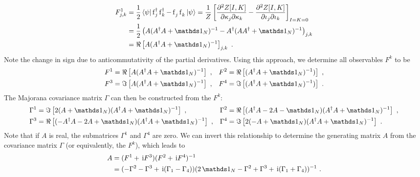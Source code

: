 \documentclass[letter]{article}
\begin{document}
\begin{align}
F^1_{j,k} &= \frac{1}{2}\sandwich{\psi}{\fd_j \fd_k - \fe_j \fe_k}{\psi} = \frac{1}{Z} \left[  \frac{\partial^2 Z[I,K]}{\partial\kappa_j\partial\kappa_k} - \frac{\partial^2 Z[I,K]}{\partial\iota_j\partial\iota_k} \right]_{I=K=0} \nonumber\\
&= \frac{1}{2}\left( A (A^\dagger A + \id_N)^{-1} - A^\dagger (A A^\dagger + \id_N)^{-1}\right)_{j,k} \nonumber\\
&= \Re\left[ A (A^\dagger A + \id_N)^{-1} \right]_{j,k} \ .
\end{align}
Note the change in sign due to anticommutativity of the partial derivatives.
Using this approach, we determine all observables $F^k$ to be 
\begin{equation}
\begin{aligned}
F^1 &= \Re\left[ A (A^\dagger A + \id_N)^{-1} \right] \ , &
F^2 &= \Re\left[(A^\dagger A + \id_N)^{-1}) \right] \ , \\
F^3 &= \Im\left[ A (A^\dagger A + \id_N)^{-1} \right] \ , &
F^4 &= \Im\left[(A^\dagger A + \id_N)^{-1}) \right] \ .
\end{aligned}
\end{equation}
The Majorana covariance matrix $\Gamma$ can then be constructed from the $F^k$:
\begin{equation}
\begin{aligned}
\Gamma^1 &= \Im\left[ 2(A + \id_N) (A^\dagger A + \id_N)^{-1} \right] \ ,&
\Gamma^2 &= \Re\left[ (A^\dagger A - 2A - \id_N) (A^\dagger A + \id_N)^{-1} \right] \ ,\\
\Gamma^3 &= \Re\left[ (-A^\dagger A - 2A + \id_N) (A^\dagger A + \id_N)^{-1} \right] \ ,&
\Gamma^4 &= \Im\left[ 2(-A + \id_N) (A^\dagger A + \id_N)^{-1} \right] \ .
\end{aligned}
\end{equation}
Note that if $A$ is real, the submatrices $\Gamma^1$ and $\Gamma^4$ are zero. We can invert this relationship to determine the generating matrix $A$ from the covariance matrix $\Gamma$ (or equivalently, the $F^k$), which leads to
\begin{align}
A &= (F^1 + \i F^3)(F^2 + \i F^4)^{-1} \\
&=  ( -\Gamma^2 - \Gamma^3 + \i (\Gamma_1 - \Gamma_4) ) (2\, \id_N - \Gamma^2 + \Gamma^3 + \i (\Gamma_1 + \Gamma_4))^{-1} \ .
\end{align}
\end{document}
